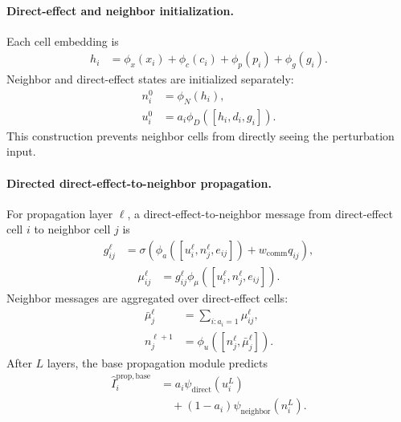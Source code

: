 \documentclass[sigconf,anonymous,review]{acmart}
\begin{document}
\paragraph{Direct-effect and neighbor initialization.}
Each cell embedding is
\[
\begin{aligned}
h_i
&=
\phi_x(x_i)+\phi_c(c_i)+\phi_p(p_i)+\phi_g(g_i).
\end{aligned}
\]
Neighbor and direct-effect states are initialized separately:
\[
\begin{aligned}
n_i^0
&=\phi_N(h_i),\\
u_i^0
&=a_i\phi_D([h_i,d_i,g_i]).
\end{aligned}
\]
This construction prevents neighbor cells from directly seeing the perturbation input.

\paragraph{Directed direct-effect-to-neighbor propagation.}
For propagation layer $\ell$, a direct-effect-to-neighbor message from direct-effect cell $i$ to neighbor cell $j$ is
\[
\begin{aligned}
g_{ij}^{\ell}
&=
\sigma\!\left(
\phi_a([u_i^\ell,n_j^\ell,e_{ij}])
+
w_{\mathrm{comm}}q_{ij}
\right),
\end{aligned}
\]
\[
\begin{aligned}
\mu_{ij}^{\ell}
&=
g_{ij}^{\ell}
\phi_\mu([u_i^\ell,n_j^\ell,e_{ij}]).
\end{aligned}
\]
Neighbor messages are aggregated over direct-effect cells:
\[
\begin{aligned}
\bar\mu_j^\ell
&=
\sum_{i:a_i=1}\mu_{ij}^{\ell},\\
n_j^{\ell+1}
&=
\phi_u([n_j^\ell,\bar\mu_j^\ell]).
\end{aligned}
\]
After $L$ layers, the base propagation module predicts
\[
\begin{aligned}
\widehat I_i^{\mathrm{prop},\mathrm{base}}
&=
a_i\psi_{\mathrm{direct}}(u_i^L)
\\
&\quad +
(1-a_i)\psi_{\mathrm{neighbor}}(n_i^L).
\end{aligned}
\]
\end{document}
